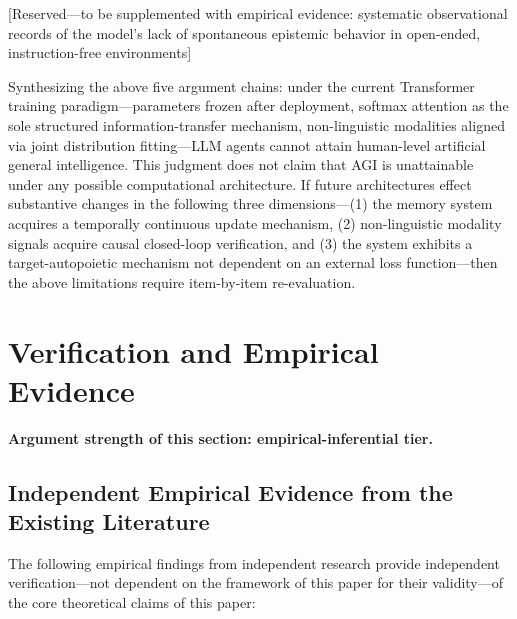 \documentclass[11pt,a4paper]{article}
\theoremstyle{definition}
\begin{document}
{[}Reserved---to be supplemented with empirical evidence: systematic observational records of the model's lack of spontaneous epistemic behavior in open-ended, instruction-free environments{]}

Synthesizing the above five argument chains: under the current Transformer training paradigm---parameters frozen after deployment, softmax attention as the sole structured information-transfer mechanism, non-linguistic modalities aligned via joint distribution fitting---LLM agents cannot attain human-level artificial general intelligence. This judgment does not claim that AGI is unattainable under any possible computational architecture. If future architectures effect substantive changes in the following three dimensions---(1) the memory system acquires a temporally continuous update mechanism, (2) non-linguistic modality signals acquire causal closed-loop verification, and (3) the system exhibits a target-autopoietic mechanism not dependent on an external loss function---then the above limitations require item-by-item re-evaluation.

\section{Verification and Empirical Evidence}
\label{sec:empirical}

\textbf{Argument strength of this section: empirical-inferential tier.}

\subsection{Independent Empirical Evidence from the Existing Literature}

The following empirical findings from independent research provide independent verification---not dependent on the framework of this paper for their validity---of the core theoretical claims of this paper:
\end{document}
